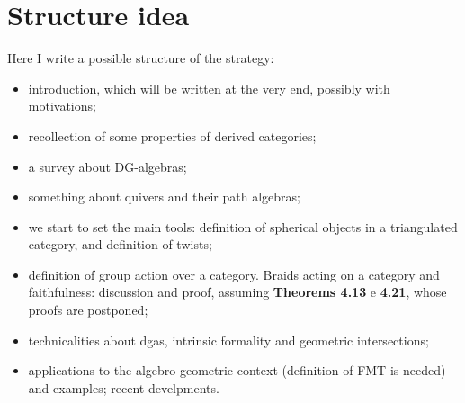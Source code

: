 \section{Structure idea}

	Here I write a possible structure of the strategy:
	\begin{itemize}
		\item introduction, which will be written at the very end,
		possibly with motivations;
		
		\item recollection of some properties of derived categories;
		
		\item a survey about DG-algebras;
		
		\item something about quivers and their path algebras;
		
		\item we start to set the main tools:
		definition of spherical objects in a triangulated category,
		and definition of twists;
		
		\item definition of group action over a category.
		Braids acting on a category and faithfulness: discussion and proof,
		assuming \textbf{Theorems 4.13} e \textbf{4.21}, whose proofs
		are postponed;
		
		\item technicalities about dgas, intrinsic formality 
		and geometric intersections;
		
		\item applications to the algebro-geometric context
		(definition of FMT is needed) and examples;
		recent develpments.
	\end{itemize}



















